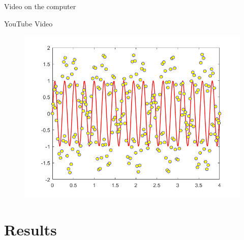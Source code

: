 \documentclass{beamer}
\begin{document}
\begin{frame}{Video on the computer}
\centering
{}
\end{frame}

\begin{frame}{YouTube Video}
\begin{figure}
\centering
\href{https://youtu.be/3BLYxQKv668}{
	\includegraphics[width=\textheight, keepaspectratio]{img/img2}
	\label{fig:my_label}}
\end{figure}
\end{frame}

	\section{Results}
	
\end{document}
